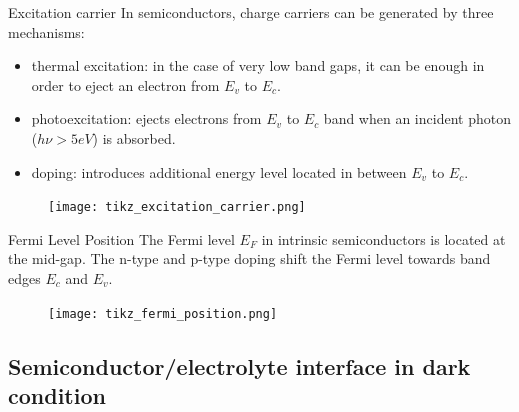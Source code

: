 \documentclass[10pt,compress]{beamer}
\begin{document}
    \begin{frame}[allowframebreaks=1.0]{Excitation carrier}
        In semiconductors, charge carriers can be generated by three mechanisms: 
        \begin{itemize}
            \item thermal excitation: in the case of very low band gaps, it can be enough in order 
            to eject an electron from $E_v$ to $E_c$.
            \item photoexcitation: ejects electrons from $E_v$ to $E_c$
            band when an incident photon ($h\nu > 5eV$) is absorbed.
            \item doping: introduces additional energy level located in between $E_v$ to $E_c$.
        \end{itemize}
        
        \begin{figure}[h]
            \centering
            \texttt{[image: tikz\_excitation\_carrier.png]}
            \label{fig_excitation_carrier}
        \end{figure}
    \end{frame}

    \begin{frame}{Fermi Level Position}
        The Fermi level $E_F$ in intrinsic semiconductors is located at the mid-gap. 
        The n-type and p-type doping shift the Fermi level towards band edges 
        $E_c$ and $E_v$.
        \begin{figure}[H]
            \centering
            \texttt{[image: tikz\_fermi\_position.png]}
            \label{fig_fermi_position}
        \end{figure}
    \end{frame}

\subsection{Semiconductor/electrolyte interface in dark condition}
\end{document}
